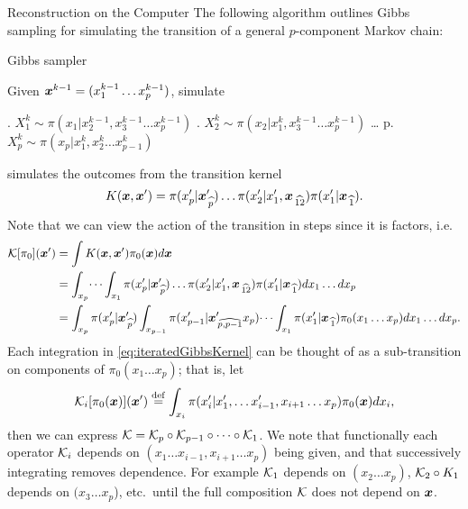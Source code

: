 \begin{chapter}{Reconstruction on the Computer}
The following algorithm outlines Gibbs sampling for simulating the transition of a general $p$-component Markov chain:
\begin{algorithm}
\caption{Gibbs sampler} \label{alg:gibbs}
  Given $\mbox{\boldmath$x$}^{k-1} = (x_1^{k-1}\dots x_p^{k-1})$, simulate
\begin{algorithmic}[0]
  . $X_1^{k} \sim \pi(x_1|x_2^{k-1},x_3^{k-1}\dots x_p^{k-1})$
  . $X_2^{k} \sim \pi(x_2|x_1^k,x_3^{k-1}\dots x_p^{k-1})$ 
  \STATE \dots
  \STATE p. $X_p^{k} \sim \pi(x_p|x_1^k,x_2^{k}\dots x_{p-1}^{k})$
\end{algorithmic}
\end{algorithm}

 simulates the outcomes from the transition kernel 
\begin{equation}
  K(\mbox{\boldmath$x$},\mbox{\boldmath$x$}') = \pi(x_p'|\mbox{\boldmath$x$}_{\,\widehat{p}}')\dots\pi(x_2'|x_1',\mbox{\boldmath$x$}_{\,\widehat{12}})\pi(x_1'|\mbox{\boldmath$x$}_{\,\widehat{1}}).
\end{equation}
Note that we can view the action of the transition in steps since it is factors, i.e.
\begin{align}
  \mathcal K [\pi_0](\mbox{\boldmath$x$}') 
    &= \int K(\mbox{\boldmath$x$},\mbox{\boldmath$x$}') \pi_0(\mbox{\boldmath$x$}) d\mbox{\boldmath$x$} \nonumber \\
    &= \int_{x_p}\dots\int_{x_1} \pi(x_p'|\mbox{\boldmath$x$}_{\,\widehat{p}}')\dots\pi(x_2'|x_1',\mbox{\boldmath$x$}_{\,\widehat{12}})\pi(x_1'|\mbox{\boldmath$x$}_{\,\widehat{1}})dx_1\dots dx_p \nonumber\\ 
    &= \int_{x_p}\pi(x_p'|\mbox{\boldmath$x$}_{\,\widehat{p}}')\int_{x_{p-1}} \pi(x_{p-1}'|\mbox{\boldmath$x$}_{\,\widehat{p,p-1}}'x_p)\dots\int_{x_1} \pi(x_1'|\mbox{\boldmath$x$}_{\,\widehat{1}}) \pi_0(x_1\dots x_p)dx_1\dots dx_p. \label{eq:iteratedGibbsKernel}
\end{align}
Each integration in \eqref{eq:iteratedGibbsKernel} can be thought of as a sub-transition on components of $\pi_0(x_1\dots x_p)$; that is, let
\begin{equation}
  \mathcal K_i[\pi_0(\mbox{\boldmath$x$})](\mbox{\boldmath$x$}') \stackrel{\rm def}{=} \int_{x_i} \pi(x_i'|x_1',\dots x_{i-1}',x_{i+1}\dots x_p) \pi_0(\mbox{\boldmath$x$})dx_i,
\end{equation}
then we can express $\mathcal K = \mathcal K_p\circ\mathcal K_{p-1}\circ \dots \circ\mathcal K_1$.
We note that functionally each operator $\mathcal K_i$ depends on $(x_1\dots x_{i-1},x_{i+1}\dots x_p)$ being given, and that successively integrating removes dependence. 
For example $\mathcal K_1$ depends on $(x_2\dots x_p)$, $\mathcal K_2\circ K_1$ depends on $(x_3\dots x_p$), etc.~until the full composition $\mathcal K$ does not depend on $\mbox{\boldmath$x$}$.


\end{chapter}
